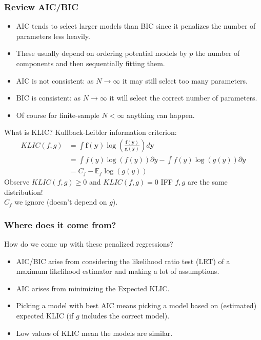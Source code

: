 \documentclass[aspectratio=169,11pt]{beamer}
\begin{document}
\begin{frame}
\frametitle{Review AIC/BIC}
\begin{itemize}
\item AIC tends to select larger models than BIC since it penalizes the number of parameters less heavily.
\item These usually depend on ordering potential models by $p$ the number of components and then sequentially fitting them.
\item AIC is not consistent: as $N \rightarrow \infty$ it may still select too many parameters.
\item BIC is consistent: as $N \rightarrow \infty$ it will select the correct number of parameters.
\item Of course for finite-sample $N < \infty$ anything can happen.
\end{itemize}
\end{frame}


\begin{frame}{What is KLIC?}
Kullback-Leibler information criterion:
\begin{align*}
KLIC(f,g) &=\int \mathbf{f}(\mathbf{y}) \log \left(\frac{\mathbf{f}(\mathbf{y})}{\mathbf{g}(\mathbf{y})}\right) d \mathbf{y}\\
&= \int  f(y) \log(f(y)) \partial y - \int  f(y) \log(g(y)) \partial y  \\
&= C_f - \mathbb{E}_f  \log(g(y))
\end{align*}
Observe $KLIC(f,g) \geq 0$ and $KLIC(f,g)=0$ IFF $f,g$ are the same distribution!\\
$C_f$ we ignore (doesn't depend on $g$).
\end{frame}

\begin{frame}
\frametitle{Where does it come from?}
How do we come up with these penalized regressions?
\begin{itemize}
\item AIC/BIC arise from considering the likelihood ratio test (LRT) of a maximum likelihood estimator and making a lot of assumptions.
\item AIC arises from minimizing the Expected KLIC.
\item Picking a model with best AIC means picking a model based on (estimated) expected KLIC (if $g$ includes the correct model).
\item Low values of KLIC mean the models are similar.
\end{itemize}
\end{frame}
\end{document}
